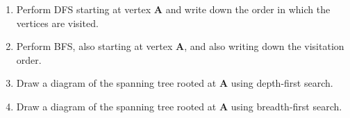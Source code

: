 \documentclass[a4paper]{article}
\begin{document}
\begin{enumerate}
\item
  Perform DFS starting at vertex \textbf{A} and write down the order in which the vertices are visited.
\item
  Perform BFS, also starting at vertex \textbf{A}, and also writing down the visitation order.
\item
  Draw a diagram of the spanning tree rooted at \textbf{A} using depth-first search.
\item
  Draw a diagram of the spanning tree rooted at \textbf{A} using breadth-first search.
\end{enumerate}
\end{document}
